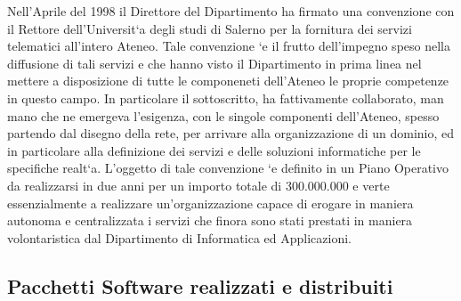 \documentclass[11pt]{article}
\begin{document}
\begin{description}
{Nell'Aprile del 1998 il Direttore del Dipartimento ha firmato una
convenzione con il Rettore dell'Universit\a`a degli studi di Salerno
per la fornitura dei servizi telematici all'intero Ateneo.  Tale
convenzione \a`e il frutto dell'impegno speso nella diffusione di tali
servizi e che hanno visto il Dipartimento in prima linea nel mettere a
disposizione di tutte le componeneti dell'Ateneo le proprie competenze
in questo campo.  In particolare il sottoscritto, ha fattivamente
collaborato, man mano che ne emergeva l'esigenza, con le singole
componenti dell'Ateneo, spesso partendo dal disegno della rete, per
arrivare alla organizzazione di un dominio, ed in particolare alla
definizione dei servizi e delle soluzioni informatiche per le
specifiche realt\a`a.  L'oggetto di tale convenzione \a`e definito in
un Piano Operativo da realizzarsi in due anni per un importo totale di
300.000.000 e verte essenzialmente a realizzare un'organizzazione
capace di erogare in maniera autonoma e centralizzata i servizi che
finora sono stati prestati in maniera volontaristica dal Dipartimento
di Informatica ed Applicazioni. }

\end{description}

\subsection{Pacchetti Software realizzati e distribuiti}
\end{document}
